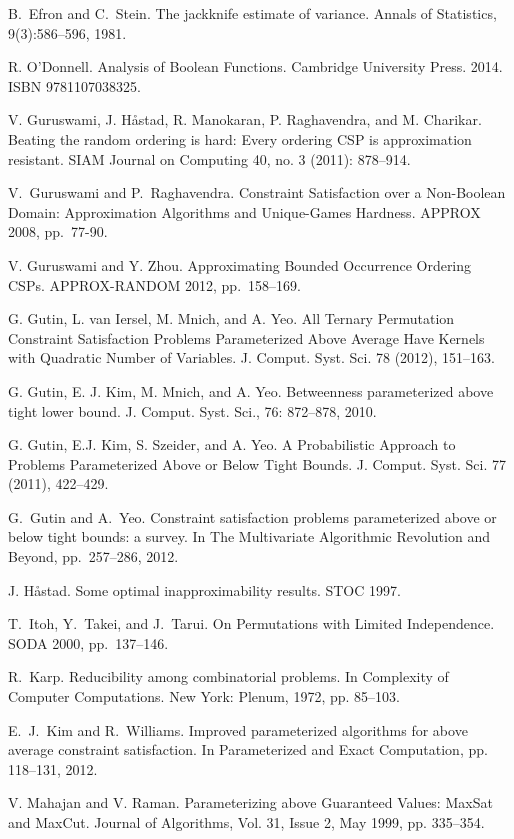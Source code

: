 \documentclass[11pt]{article}
\begin{document}
\begin{thebibliography}{WW}
 B.~Efron and C.~Stein. The jackknife estimate of variance. Annals of
Statistics, 9(3):586--596, 1981.

 R. O'Donnell. Analysis of Boolean Functions. Cambridge University Press. 2014. ISBN 9781107038325.

V. Guruswami, J. H\aa{}stad, R. Manokaran, P. Raghavendra, and M. Charikar. Beating the random ordering is hard: Every ordering CSP is approximation resistant. SIAM Journal on Computing 40, no. 3 (2011): 878--914.


V.~Guruswami and P.~Raghavendra. Constraint Satisfaction over a Non-Boolean Domain:
Approximation Algorithms and Unique-Games Hardness. APPROX 2008, pp.~77-90.

V. Guruswami and Y. Zhou.
Approximating Bounded Occurrence Ordering CSPs. APPROX-RANDOM 2012, pp.~158--169.

G. Gutin, L. van Iersel, M. Mnich, and A. Yeo. All Ternary Permutation Constraint Satisfaction Problems Parameterized Above Average Have Kernels with Quadratic Number of Variables. J. Comput. Syst. Sci. 78 (2012), 151--163.

G. Gutin, E. J. Kim, M. Mnich, and A. Yeo. Betweenness parameterized above tight lower bound. J. Comput. Syst. Sci., 76: 872--878, 2010.

G. Gutin, E.J. Kim, S. Szeider, and A. Yeo. A Probabilistic Approach to Problems Parameterized
Above or Below Tight Bounds. J. Comput. Syst. Sci. 77 (2011), 422--429.


 G.~Gutin and A.~Yeo. Constraint satisfaction problems parameterized above or below tight bounds: a survey. In The Multivariate Algorithmic Revolution and Beyond,
pp.~257--286, 2012.

J. H{\aa}stad. Some optimal inapproximability results. STOC 1997.


T.~Itoh, Y.~Takei, and J.~Tarui.
On Permutations with Limited Independence.
SODA 2000, pp.~137--146.

R.~Karp.
Reducibility among combinatorial problems. In Complexity of Computer Computations.
New York: Plenum, 1972, pp. 85--103.

 E.~J.~Kim and R.~Williams. Improved parameterized algorithms for above average constraint satisfaction. In Parameterized and Exact Computation, pp. 118--131, 2012.

 V. Mahajan and V. Raman. Parameterizing above Guaranteed Values: MaxSat and MaxCut. Journal of Algorithms, Vol. 31, Issue 2, May 1999, pp. 335--354.


\end{thebibliography}
\end{document}
